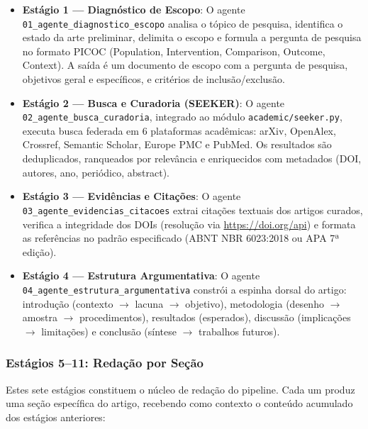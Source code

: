 \begin{itemize}
  \item \textbf{Estágio 1 — Diagnóstico de Escopo}: O agente \texttt{01\_agente\_diagnostico\_escopo} analisa o tópico de pesquisa, identifica o estado da arte preliminar, delimita o escopo e formula a pergunta de pesquisa no formato PICOC (Population, Intervention, Comparison, Outcome, Context). A saída é um documento de escopo com a pergunta de pesquisa, objetivos geral e específicos, e critérios de inclusão/exclusão.
  
  \item \textbf{Estágio 2 — Busca e Curadoria (SEEKER)}: O agente \texttt{02\_agente\_busca\_curadoria}, integrado ao módulo \texttt{academic/seeker.py}, executa busca federada em 6 plataformas acadêmicas: arXiv, OpenAlex, Crossref, Semantic Scholar, Europe PMC e PubMed. Os resultados são deduplicados, ranqueados por relevância e enriquecidos com metadados (DOI, autores, ano, periódico, abstract).
  
  \item \textbf{Estágio 3 — Evidências e Citações}: O agente \texttt{03\_agente\_evidencias\_citacoes} extrai citações textuais dos artigos curados, verifica a integridade dos DOIs (resolução via \url{https://doi.org/api}) e formata as referências no padrão especificado (ABNT NBR 6023:2018 ou APA 7ª edição).
  
  \item \textbf{Estágio 4 — Estrutura Argumentativa}: O agente \texttt{04\_agente\_estrutura\_argumentativa} constrói a espinha dorsal do artigo: introdução (contexto $\to$ lacuna $\to$ objetivo), metodologia (desenho $\to$ amostra $\to$ procedimentos), resultados (esperados), discussão (implicações $\to$ limitações) e conclusão (síntese $\to$ trabalhos futuros).
\end{itemize}

\subsubsection{Estágios 5--11: Redação por Seção}

Estes sete estágios constituem o núcleo de redação do pipeline. Cada um produz uma seção específica do artigo, recebendo como contexto o conteúdo acumulado dos estágios anteriores:

